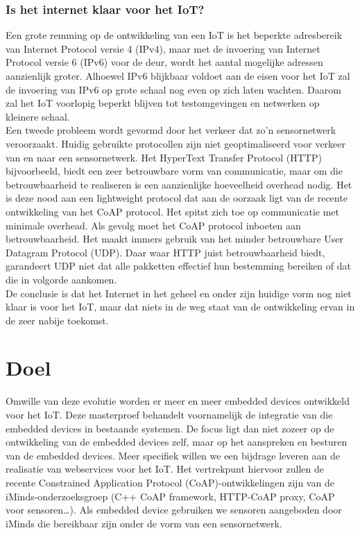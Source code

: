 \subsubsection{Is het internet klaar voor het IoT?}
Een grote remming op de ontwikkeling van een IoT is het beperkte adresbereik van Internet Protocol versie 4 (IPv4), maar met de invoering van Internet Protocol versie 6 (IPv6) voor de deur, wordt het aantal mogelijke adressen aanzienlijk groter.
Alhoewel IPv6 blijkbaar voldoet aan de eisen voor het IoT zal de invoering van IPv6 op grote schaal nog even op zich laten wachten. Daarom zal het IoT voorlopig beperkt blijven tot testomgevingen en netwerken op kleinere schaal.\\
Een tweede probleem wordt gevormd door het verkeer dat zo'n sensornetwerk veroorzaakt. Huidig gebruikte protocollen zijn niet geoptimaliseerd voor verkeer van en naar een sensornetwerk. Het HyperText Transfer Protocol (HTTP) bijvoorbeeld, biedt een zeer betrouwbare vorm van communicatie, maar om die betrouwbaarheid te realiseren is een aanzienlijke hoeveelheid overhead nodig. Het is deze nood aan een lightweight protocol dat aan de oorzaak ligt van de recente ontwikkeling van het CoAP protocol. Het spitst zich toe op communicatie met minimale overhead. Als gevolg moet het CoAP protocol inboeten aan betrouwbaarheid. Het maakt immers gebruik van het minder betrouwbare User Datagram Protocol (UDP). Daar waar HTTP juist betrouwbaarheid biedt, garandeert UDP niet dat alle pakketten effectief hun bestemming bereiken of dat die in volgorde aankomen.\\
De conclusie is dat het Internet in het geheel en onder zijn huidige vorm nog niet klaar is voor het IoT, maar dat niets in de weg staat van de ontwikkeling ervan in de zeer nabije toekomst.


\section{Doel}

Omwille van deze evolutie worden er meer en meer embedded devices ontwikkeld voor het IoT. Deze masterproef behandelt voornamelijk de integratie van die embedded devices in bestaande systemen. De focus ligt dan niet zozeer op de ontwikkeling van de embedded devices zelf, maar op het aanspreken en besturen van de embedded devices. Meer specifiek willen we een bijdrage leveren aan de realisatie van webservices voor het IoT. Het vertrekpunt hiervoor zullen de recente Constrained Application Protocol (CoAP)-ontwikkelingen zijn van de iMinds-onderzoeksgroep (C++ CoAP framework, HTTP-CoAP proxy, CoAP voor sensoren…). Als embedded device gebruiken we sensoren aangeboden door iMinds die bereikbaar zijn onder de vorm van een sensornetwerk.\\

